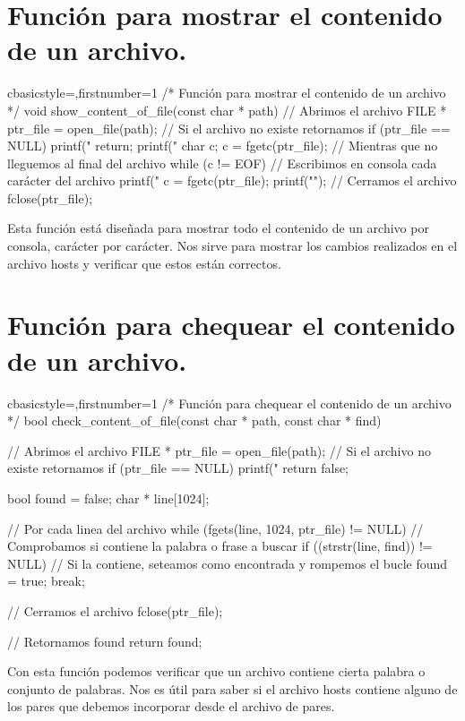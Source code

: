 \section{Función para mostrar el contenido de un archivo.}
	\begin{sourcecodep}[]{c}{basicstyle={\fontsize{12}{12}\selectfont\ttfamily},firstnumber=1}{}
		/*
		Función para mostrar el contenido de un archivo
		*/
		void show_content_of_file(const char * path) {
			// Abrimos el archivo
			FILE * ptr_file = open_file(path);
			// Si el archivo no existe retornamos
			if (ptr_file == NULL)
			{
				printf("%
				return;
			}
			printf("%
			char c;
			c = fgetc(ptr_file);
			// Mientras que no lleguemos al final del archivo
			while (c != EOF)
			{
				// Escribimos en consola cada carácter del archivo
				printf("%
				c = fgetc(ptr_file);
			}
			printf("\n");
			// Cerramos el archivo
			fclose(ptr_file);
		}\end{sourcecodep}
	Esta función está diseñada para mostrar todo el contenido de un archivo por consola, carácter por carácter. Nos sirve para mostrar los cambios realizados en el archivo hosts y verificar que estos están correctos.
\newpage
\section{Función para chequear el contenido de un archivo.}
	\begin{sourcecodep}[]{c}{basicstyle={\fontsize{12}{12}\selectfont\ttfamily},firstnumber=1}{}
		/*
		Función para chequear el contenido de un archivo
		*/
		bool check_content_of_file(const char * path, const char * find) {
			
			// Abrimos el archivo
			FILE * ptr_file = open_file(path);
			// Si el archivo no existe retornamos
			if (ptr_file == NULL)
			{
				printf("%
				return false;
			}
			
			bool found = false;
			char * line[1024];
			
			// Por cada linea del archivo
			while (fgets(line, 1024, ptr_file) != NULL) {
				// Comprobamos si contiene la palabra o frase a buscar
				if ((strstr(line, find)) != NULL) {
					// Si la contiene, seteamos como encontrada y rompemos el bucle
					found = true;
					break;
				}
			}
			
			// Cerramos el archivo
			fclose(ptr_file);
			
			// Retornamos found
			return found;
		}\end{sourcecodep}
	Con esta función podemos verificar que un archivo contiene cierta palabra o conjunto de palabras. Nos es útil para saber si el archivo hosts contiene alguno de los pares que debemos incorporar desde el archivo de pares.
\newpage

